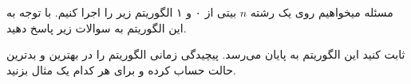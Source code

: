 ‌مسئله
میخواهیم روی یک رشته $n$ بیتی از ۰ و ۱ الگوریتم زیر را اجرا کنیم. با توجه به این الگوریتم به سوالات زیر پاسخ دهید.







ثابت کنید این الگوریتم به پایان می‌رسد.
پیچیدگی زمانی الگوریتم را در بهترین و بدترین حالت حساب کرده و برای هر کدام یک مثال بزنید.











